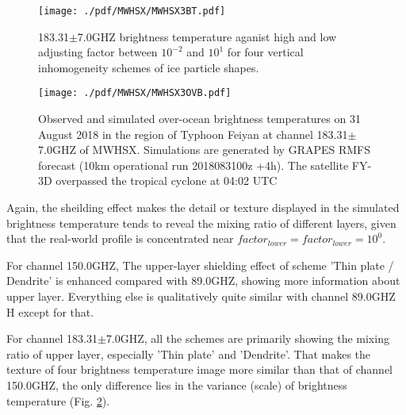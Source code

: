\begin{figure}[hbtp] 
\centering
\texttt{[image: ./pdf/MWHSX/MWHSX3BT.pdf]}
\caption{183.31$\pm$7.0GHZ brightness temperature aganist high and low adjusting factor between $10^{-2}$ and $10^{1}$ for four vertical 
inhomogeneity schemes of ice particle shapes.}
\label{fig:MWHSX3BT}
\end{figure}

\begin{figure}[hbtp] 
\centering
\texttt{[image: ./pdf/MWHSX/MWHSX3OVB.pdf]}
\caption{Observed and simulated over-ocean brightness temperatures on 31 August 2018 in the region of Typhoon Feiyan at channel 183.31$\pm$7.0GHZ of MWHSX.
Simulations are generated by GRAPES RMFS forecast (10km operational run 2018083100z +4h). The satellite FY-3D overpassed the
tropical cyclone at 04:02 UTC}
\label{fig:MWHSX3OVB}
\end{figure}

Again, the sheilding effect makes the detail or texture displayed in the simulated brightness temperature tends to reveal the mixing ratio of different layers, given that
the real-world profile is concentrated near $factor_{lower} = factor_{lower} = 10^{0}$.

For channel 150.0GHZ, The upper-layer shielding effect of scheme 'Thin plate / Dendrite' is enhanced compared with 89.0GHZ, showing more information about upper layer.
Everything else is qualitatively quite similar with channel 89.0GHZ H except for that.

For channel 183.31$\pm$7.0GHZ, all the schemes are primarily showing the mixing ratio of upper layer, especially 'Thin plate' and 'Dendrite'. 
That makes the texture of four brightness temperature image more similar than that of channel 150.0GHZ, 
the only difference lies in the variance (scale) of brightness temperature (Fig. \ref{fig:MWHSX3OVB}).

\clearpage
